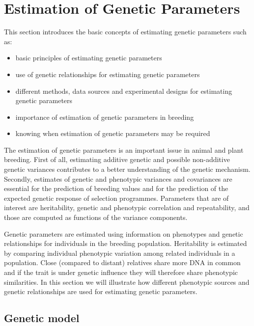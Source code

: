 \documentclass[
]{book}
\providecommand{\tightlist}{%
  \setlength{\itemsep}{0pt}\setlength{\parskip}{0pt}}
\begin{document}
\hypertarget{estimation-of-genetic-parameters}{%
\chapter{Estimation of Genetic Parameters}\label{estimation-of-genetic-parameters}}

This section introduces the basic concepts of estimating genetic parameters such as:

\begin{itemize}
\tightlist
\item
  basic principles of estimating genetic parameters
\item
  use of genetic relationships for estimating genetic parameters
\item
  different methods, data sources and experimental designs for estimating genetic parameters
\item
  importance of estimation of genetic parameters in breeding
\item
  knowing when estimation of genetic parameters may be required
\end{itemize}

The estimation of genetic parameters is an important issue in animal and plant breeding. First of
all, estimating additive genetic and possible non-additive genetic variances contributes
to a better understanding of the genetic mechanism. Secondly, estimates of genetic and
phenotypic variances and covariances are essential for the prediction of breeding values
and for the prediction of the expected genetic response of
selection programmes. Parameters that are of interest are heritability, genetic and
phenotypic correlation and repeatability, and those are computed as functions of the
variance components.

Genetic parameters are estimated using information on phenotypes and genetic relationships
for individuals in the breeding population. Heritability is estimated by comparing individual
phenotypic variation among related individuals in a population. Close (compared to distant) relatives
share more DNA in common and if the trait is under genetic influence they will therefore share
phenotypic similarities. In this section we will illustrate how different phenotypic sources
and genetic relationships are used for estimating genetic parameters.

\hypertarget{genetic-model}{%
\section{Genetic model}\label{genetic-model}}
\end{document}
